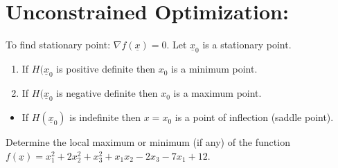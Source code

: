 \documentclass[../main-sheet.tex]{subfiles}
\begin{document}
\section{Unconstrained Optimization:} To find stationary point: \(\nabla f(\underline{x})=0\). Let \(\underline{x}_0\) is a stationary point.
\begin{enumerate}[label=(\roman*)]
    \item If \(H(\underline{x}_0\) is positive definite then \(x_0\) is a minimum point.
    \item If \(H(\underline{x}_0\) is negative definite then \(x_0\) is a maximum point.
\end{enumerate}
\begin{itemize}
    \item If \(H(\underline{x}_0)\) is indefinite then \(x=x_0\) is a point of inflection (saddle point).
\end{itemize}
\begin{prob}
    Determine the local maximum or minimum (if any) of the function \(f(\underline{x})=x_1^2+2x_2^2+x_3^2+x_1x_2-2x_3-7x_1+12\).
\end{prob}
\end{document}

